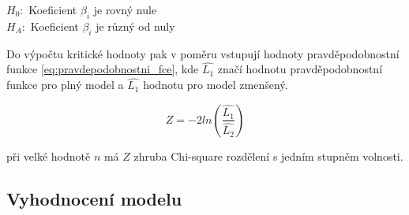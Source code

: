 $H_0:$ Koeficient $\beta_i$ je rovný nule \\
$H_A:$ Koeficient $\beta_i$ je různý od nuly

Do výpočtu kritické hodnoty pak v poměru vstupují hodnoty pravděpodobnostní funkce \ref{eq:pravdepodobnostni_fce}, kde 
$\hat{L_1}$ značí hodnotu pravděpodobnostní funkce pro plný model a $\hat{L_1}$ hodnotu pro model zmenšený.

\begin{equation}
    Z = -2ln(\frac{\hat{L_1}}{\hat{L_2}})
\end{equation}

při velké hodnotě $n$ má $Z$ zhruba Chi-square rozdělení s jedním stupněm volnosti.

\subsection{Vyhodnocení modelu}
